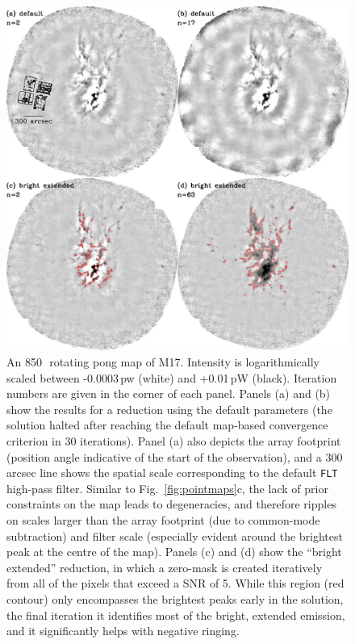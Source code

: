 \documentclass[useAMS,usenatbib,nofootinbib]{mn2e}
\newcommand{\model}[1]{\texttt{#1}}
\begin{document}
\begin{figure}
\centering
\includegraphics[width=\linewidth]{m17.pdf}
\caption{An 850\,\micron\ rotating pong map of M17. Intensity is
logarithmically scaled between -0.0003\,pw (white) and +0.01\,pW
(black). Iteration numbers are given in the corner of each
panel. Panels (a) and (b) show the results for a reduction using the
default parameters (the solution halted after reaching the default
map-based convergence criterion in 30 iterations). Panel (a) also
depicts the array footprint (position angle indicative of the start of
the observation), and a 300\,arcsec line shows the spatial scale
corresponding to the default \model{FLT} high-pass filter. Similar to
Fig.~\ref{fig:pointmaps}c, the lack of prior constraints on the map
leads to degeneracies, and therefore ripples on scales larger than the
array footprint (due to common-mode subtraction) and filter scale
(especially evident around the brightest peak at the centre of the
map). Panels (c) and (d) show the ``bright extended'' reduction, in
which a zero-mask is created iteratively from all of the pixels that
exceed a SNR of 5. While this region (red contour) only encompasses
the brightest peaks early in the solution, the final iteration it
identifies most of the bright, extended emission, and it significantly
helps with negative ringing.}
\label{fig:m17}
\end{figure}
\end{document}
